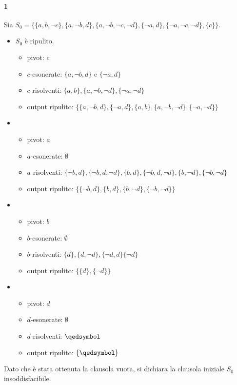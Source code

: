 \paragraph{1}
Sia $S_0 = \{\{a,b,\neg c\}, \{a, \neg b, d\}, \{a, \neg b, \neg c, \neg d\}, 
\{\neg a, d\}, \{\neg a, \neg c, \neg d\}, \{c\}\}$. 
\begin{itemize}
  \item $S_0$ è ripulito.
    \begin{itemize}
      \item pivot: $c$
      \item $c$-esonerate: $\{a, \neg b, d\}$ e $\{\neg a, d\}$
      \item $c$-risolventi: $\{a,b\}, \{a, \neg b, \neg d\}, \{\neg a, \neg d\}$
      \item output ripulito: $\{\{a, \neg b, d\}, \{\neg a, d\}, \{a, b\}, \{a, \neg b, \neg d\}, \{\neg a, \neg d\}\}$
    \end{itemize}
  \item
    \begin{itemize}
      \item pivot: $a$
      \item $a$-esonerate: $\emptyset$
      \item $a$-risolventi: $\{\neg b, d\}, \{\neg b, d, \neg d\}, \{b, d\}, \{\neg b, d, \neg d\}, \{b, \neg d\}, \{\neg b, \neg d\}$
      \item output ripulito: $\{\{\neg b, d\}, \{b, d\}, \{b, \neg d\}, \{\neg b, \neg d\}\}$
    \end{itemize}
  \item
    \begin{itemize}
      \item pivot: $b$
      \item $b$-esonerate: $\emptyset$
      \item $b$-risolventi: $\{d\},\{d, \neg d\}, \{\neg d, d\} \{\neg d\}$
      \item output ripulito: $\{\{d\}, \{\neg d\}\}$
    \end{itemize}
  \item 
    \begin{itemize}
      \item pivot: $d$
      \item $d$-esonerate: $\emptyset$
      \item $d$-risolventi: $\qedsymbol$
      \item output ripulito: $\{\qedsymbol\}$
    \end{itemize}
\end{itemize}
Dato che è stata ottenuta la clausola vuota, si dichiara la clausola iniziale $S_0$ insoddisfacibile. 
